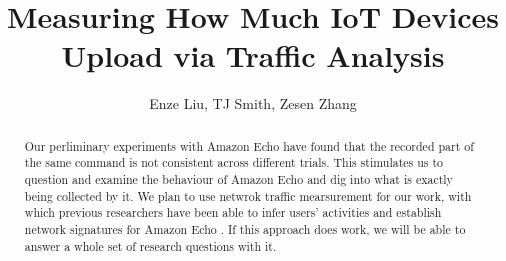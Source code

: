 \documentclass[sigconf,anonymous=false]{acmart}
\begin{document}
\title{Measuring How Much IoT Devices Upload via Traffic Analysis} %
\author{Enze Liu, TJ Smith, Zesen Zhang}


\begin{abstract}
Our perliminary experiments with Amazon Echo have found that the recorded part of the same command is not consistent across different trials. This stimulates us to question and examine the behaviour of Amazon Echo and dig into what is exactly being collected by it. We plan to use netwrok traffic mearsurement for our work, with which previous researchers have been able to infer users' activities \cite{apthorpe2017spying} and establish network signatures for Amazon Echo \cite{ford2019alexa}. If this approach does work, we will be able to answer a whole set of research questions with it.
\end{abstract}




\maketitle




\end{document}
